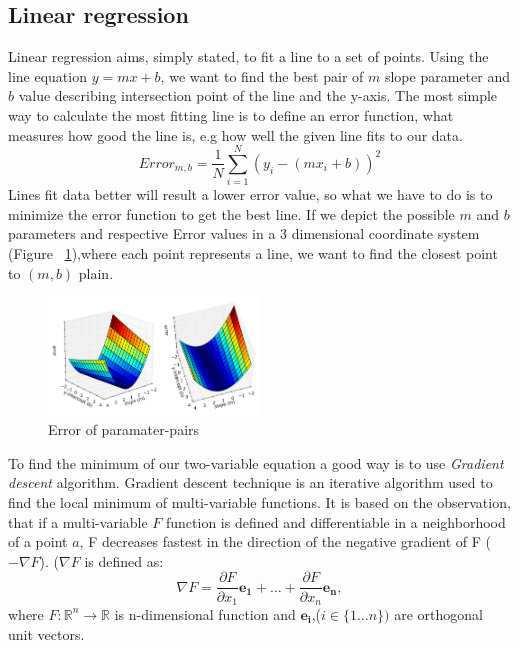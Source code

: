 \subsection{Linear regression} \label{linearregression}
Linear regression aims, simply stated, to fit a line to a set of points. Using the line equation $y=mx+b$, we want to find the best pair of $m$ slope parameter and $b$ value describing intersection point of the line and the y-axis. The most simple way  to calculate the most fitting line is to define an error function, what measures how good  the line is, e.g how well the given line fits to our data.
\begin{equation}
Error_{m,b}= \dfrac{1}{N} \sum_{i=1}^{N}(y_i-(mx_i+b))^{2}
\end{equation}
Lines fit data better will result a lower error value, so what we have to do is to minimize the error function to get the best line. If we depict the possible $m$ and $b$ parameters and respective Error values in a 3 dimensional coordinate system (Figure ~\ref{fig:gradient_descent_error_surface}),where each point represents a line, we want to find the closest point to $(m,b)$ plain. 
\begin{figure}[!ht]
  \centering    
      \includegraphics[width=0.5\textwidth]{figures/gradient_descent_error_surface.png}
  \caption{Error of paramater-pairs\cite{gradientdescent}}
  \label{fig:gradient_descent_error_surface}
\end{figure}

To find the minimum of our two-variable equation a good way is to use \textit{Gradient descent}\cite{wikigraddesc} algorithm. Gradient descent technique is an iterative algorithm used to find the local minimum of multi-variable functions. It is based on the observation, that if a multi-variable $F$ function is defined and differentiable in a neighborhood of a point $a$, F decreases fastest in the direction of the negative gradient of F ($-\nabla F$). ($\nabla F$ is defined as: 
\begin{equation}
\nabla F= \dfrac{\partial F}{\partial x_1}\boldsymbol{e_1}+\dots+\dfrac{\partial F}{\partial x_n}\boldsymbol{e_n},
\end{equation} 
where $F:\mathbb{R}^{n}\to 	\mathbb{R}$ is n-dimensional function and $\boldsymbol{e_i}$,($i\in\{1\dots n\})$ are orthogonal unit vectors.


